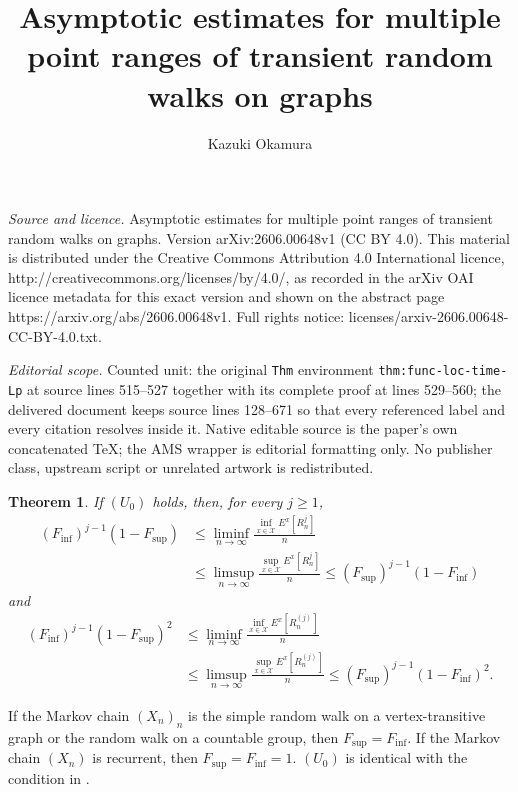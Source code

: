 \documentclass[10pt,a4paper]{amsart}
\newtheorem{Thm}{Theorem}[section]
\begin{document}
\title[Asymptotic estimates for multiple point ranges of transient ]{Asymptotic estimates for multiple point ranges of transient random walks on graphs}
\author{Kazuki Okamura}
\date{}
\maketitle
\noindent\emph{Source and licence.} Asymptotic estimates for multiple point ranges of transient random walks on graphs. Version arXiv:2606.00648v1 (CC BY 4.0). This material is distributed under the Creative Commons Attribution 4.0 International licence, http://creativecommons.org/licenses/by/4.0/, as recorded in the arXiv OAI licence metadata for this exact version and shown on the abstract page https://arxiv.org/abs/2606.00648v1. Full rights notice: licenses/arxiv-2606.00648-CC-BY-4.0.txt.\par\smallskip
\noindent\textit{Editorial scope.} Counted unit: the original \texttt{Thm} environment \texttt{thm:func-loc-time-Lp} at source lines 515--527 together with its complete proof at lines 529--560; the delivered document keeps source lines 128--671 so that every referenced label and every citation resolves inside it. Native editable source is the paper's own concatenated TeX; the AMS wrapper is editorial formatting only. No publisher class, upstream script or unrelated artwork is redistributed.
\begin{Thm}\label{thm:main-exp}
If $(U_0)$ holds, then, for every $j \ge 1$, 
\begin{align*} 
(F_{\inf})^{j-1} (1-F_{\sup}) &\le  \liminf_{n \to \infty} \frac{\inf_{x \in \mathcal{X}} E^{x} \left[R_n^j \right]}{n} \\
&\le \limsup_{n \to \infty} \frac{\sup_{x \in \mathcal{X}} E^{x} \left[R_n^j \right]}{n}  \le (F_{\sup})^{j-1} (1-F_{\inf}) 
\end{align*}
and 
\begin{align*}  
(F_{\inf})^{j-1} (1-F_{\sup})^2 &\le  \liminf_{n \to \infty} \frac{\inf_{x \in \mathcal{X}} E^{x} \left[R_n^{(j)} \right]}{n} \\
&\le \limsup_{n \to \infty} \frac{\sup_{x \in \mathcal{X}} E^{x} \left[R_n^{(j)} \right]}{n}  \le (F_{\sup})^{j-1} (1-F_{\inf})^2. 
\end{align*}
\end{Thm}

If  the Markov chain $(X_n)_n$ is the simple random walk on a vertex-transitive graph or the random walk on a countable group, then $F_{\sup} = F_{\inf}$. 
If  the Markov chain $(X_n)$ is recurrent, then $F_{\sup} = F_{\inf} = 1$. 
$(U_0)$ is identical with the condition in \cite[Lemma 2.1]{Okamura2014}. 
\end{document}
